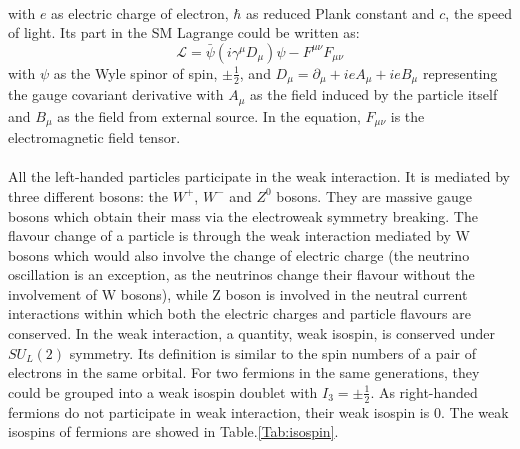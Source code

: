 \\
with $e$ as electric charge of electron, $\hbar$ as reduced Plank constant and $c$, the speed of light. Its part in the SM Lagrange could be written as:
\begin{equation}
\mathcal{L}=\bar{\psi}(i\gamma^{\mu}D_{\mu})\psi-F^{\mu\nu}F_{\mu\nu}
   \label{Eq:EM Lagrange}  
\end{equation}
with $\psi$ as the Wyle spinor of spin, $\pm \frac{1}{2}$, and $D_\mu=\partial_\mu+ieA_\mu+ieB_\mu$ representing the gauge covariant derivative with $A_\mu$ as the field induced by the particle itself and $B_\mu$ as the field from external source. In the equation, $F_{\mu\nu}$ is the electromagnetic field tensor. 
\\
\\All the left-handed particles participate in the weak interaction. It is mediated by three different bosons: the $W^+$, $W^-$ and $Z^0$ bosons. They are massive gauge bosons which obtain their mass via the electroweak symmetry breaking. The flavour change of a particle is through the weak interaction mediated by W bosons which would also involve the change of electric charge (the neutrino oscillation is an exception, as the neutrinos change their flavour without the involvement of W bosons),  while Z boson is involved in the neutral current interactions within which both the electric charges and particle flavours are conserved. In the weak interaction, a quantity, weak isospin, is conserved under $SU_L(2)$ symmetry. Its definition is similar to the spin numbers of a pair of electrons in the same orbital. For two fermions in the same generations, they could be grouped into a weak isospin doublet with $I_3=\pm\frac{1}{2}$. As right-handed fermions do not participate in weak interaction, their weak isospin is 0. The weak isospins of fermions are showed in Table.\ref{Tab:isospin}. 
\\


